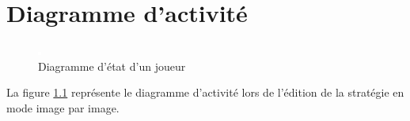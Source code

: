 
\chapter{Diagramme d'activité}
\label{s:diagramme_activite}

\begin{figure}[htpb]
    \centering
    \includegraphics[scale=0.32]{fig/activity_diagram_imagepimage.png}
    \caption{Diagramme d'état d'un joueur}
    \label{fig:activity_diagram_imagepimage}
\end{figure}

La figure \ref{fig:activity_diagram_imagepimage} représente le diagramme d'activité lors de l'édition de la stratégie en mode image par image.

